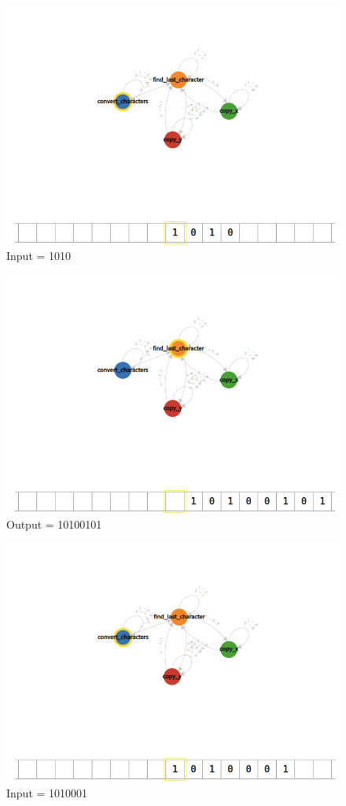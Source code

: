 \documentclass[12pt]{article}
\begin{document}
\begin{figure}[H]
    \caption{Input = 1010}
    \centering
    \includegraphics[width=12cm]{Q2/1010.png}
\end{figure}
\begin{figure}[H]
    \caption{Output = 10100101}
    \centering
    \includegraphics[width=12cm]{Q2/10100101.png}
\end{figure}
\begin{figure}[H]
    \caption{Input = 1010001}
    \centering
    \includegraphics[width=12cm]{Q2/1010001.png}
\end{figure}
\end{document}
